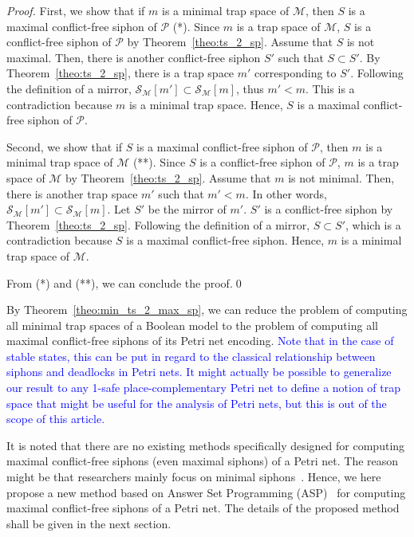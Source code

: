 \documentclass[runningheads]{llncs}
\newcommand{\revise}[1]{\textcolor{blue}{#1}}
\begin{document}
\begin{proof}

  First, we show that if \(m\) is a minimal trap space of \(\mathcal{M}\), then \(S\) is a maximal conflict-free siphon of \(\mathcal{P}\) (*). Since \(m\) is a trap space of \(\mathcal{M}\), \(S\) is a conflict-free siphon of \(\mathcal{P}\) by Theorem~\ref{theo:ts_2_sp}. Assume that \(S\) is not maximal. Then, there is another conflict-free siphon \(S'\) such that \(S \subset S'\). By Theorem~\ref{theo:ts_2_sp}, there is a trap space \(m'\) corresponding to \(S'\). Following the definition of a mirror, \(\mathcal{S}_{\mathcal{M}}[m'] \subset \mathcal{S}_{\mathcal{M}}[m]\), thus \(m' < m\). This is a contradiction because \(m\) is a minimal trap space. Hence, \(S\) is a maximal conflict-free siphon of \(\mathcal{P}\).

  Second, we show that if \(S\) is a maximal conflict-free siphon of \(\mathcal{P}\), then \(m\) is a minimal trap space of \(\mathcal{M}\) (**). Since \(S\) is a conflict-free siphon of \(\mathcal{P}\), \(m\) is a trap space of \(\mathcal{M}\) by Theorem~\ref{theo:ts_2_sp}. Assume that \(m\) is not minimal. Then, there is another trap space \(m'\) such that \(m' < m\). In other words, \(\mathcal{S}_{\mathcal{M}}[m'] \subset \mathcal{S}_{\mathcal{M}}[m]\). Let \(S'\) be the mirror of \(m'\). \(S'\) is a conflict-free siphon by Theorem~\ref{theo:ts_2_sp}. Following the definition of a mirror, \(S \subset S'\), which is a contradiction because \(S\) is a maximal conflict-free siphon. Hence, \(m\) is a minimal trap space of \(\mathcal{M}\).

  From (*) and (**), we can conclude the proof.\qed%
\end{proof}

By Theorem~\ref{theo:min_ts_2_max_sp}, we can reduce the problem of computing all minimal trap spaces of a Boolean model to the problem of computing all maximal conflict-free siphons of its Petri net encoding.
\revise{Note that in the case of stable states, this can be put in regard to the classical relationship between siphons and deadlocks in Petri nets.
It might actually be possible to generalize our result to any 1-safe place-complementary Petri net to define a notion of trap space that might be useful for the analysis of Petri nets, but this is out of the scope of this article.
}

It is noted that there are no existing methods specifically designed for computing maximal conflict-free siphons (even maximal siphons) of a Petri net. The reason might be that researchers mainly focus on minimal siphons~\cite{DBLP:journals/isci/LiuB16}. Hence, we here propose a new method based on Answer Set Programming (ASP)~\cite{DBLP:journals/aicom/GebserKKOSS11} for computing maximal conflict-free siphons of a Petri net. The details of the proposed method shall be given in the next section.
\end{document}
